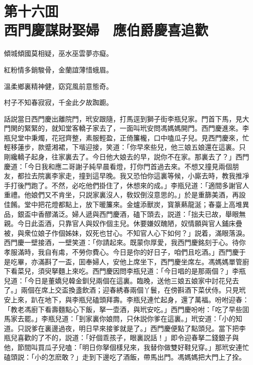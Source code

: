 
\chapter*{第十六囬　\\西門慶謀財娶婦　應伯爵慶喜追歡}


\begin{myquote}
傾城傾國莫相疑，巫水巫雲夢亦癡。

紅粉情多銷駿骨，金蘭誼薄惜蛾眉。

溫柔鄉裏精神健，窈窕風前意態奇。

村子不知春寂寂，千金此夕故踟躕。
\end{myquote}

話説當日西門慶出離院門，玳安跟隨，打馬逕到獅子街李瓶兒家。門首下馬，見大門関的緊緊的，就知堂客轎子家去了，一面叫玳安問馮媽媽開門。西門慶進來。李瓶兒堂中秉燭，花冠齊整，素服輕盈，正倚簾櫳，口中嗑瓜子兒。見西門慶來，忙輕移蓮步，款蹙湘裙，下堦迎接，笑道：「你早來些兒，他三娘五娘還在這裏。只剛纔轎子起身，往家裏去了。今日他大娘去的早，説你不在家。那裏去了？」西門慶道：「今日我和應二哥謝子純早晨看燈，打你門首過去來。不想又撞見兩個朋友，都拉去院裏李家走，撞到這早晚。我又恐怕你這裏等候，小廝去時，教我推凈手打後門跑了。不然，必吃他們掛住了，休想來的成。」李瓶兒道：「適間多謝官人重禮。他娘們又不肯坐，只説家裏沒人，敎奴倒沒意思的。」於是重篩美酒，再設佳餚。堂中把花燈都點上，放下暖簾來。金爐添獸炭，寳篆爇龍涎；春臺上高堆異品，銀盃中香醪滿泛。婦人遞與西門慶酒，磕下頭去，説道：「拙夫已故，舉眼無親。今日此盃酒，只靠官人與奴作個主兒。休要嫌奴醜陋，奴情願與官人鋪床疊被，與衆位娘子作個姊妹，奴死也甘心。不知官人心下如何？」説着，滿眼落淚。西門慶一壁接酒，一壁笑道：「你請起來。既蒙你厚愛，我西門慶銘刻于心。待你孝服滿時，我自有䖏，不勞你費心。今日是你的好日子，咱們且吃酒。」西門慶于是吃畢，亦滿斟了一盃，囬奉婦人，安他上席坐下，西門慶坐席左。馮媽媽單管廚下看菜兒，須臾拏麵上來吃。西門慶因問李瓶兒道：「今日唱的是那兩個？」李瓶兒道：「今日是董嬌兒韓金釧兒兩個在這裏。臨晚，送他三娘五娘家中討花兒去了。」兩個在席上交盃換盞飲酒；迎春綉春兩個丫鬟，在傍斟酒下菜伏侍。只見玳安上來，趴在地下，與李瓶兒磕頭拜壽。李瓶兒連忙起身，還了萬福。吩咐迎春：「教老馮廚下看壽麵點心下飯，拏一壶酒，與玳安吃。」西門慶吩咐：「吃了早些囬馬家去罷。」李瓶兒道：「到家裏你娘問，只休説你爹在這裏。」玳安道：「小的知道。只説爹在裏邊過夜，明日早來接爹就是了。」西門慶便點了點頭兒。當下把李瓶兒喜歡的了不的，説道：「好個乖孩子，眼裏説話！」即令迎春拏二錢銀子與他，節間叫買瓜子兒嗑：「明日你拏個樣兒來，我替你做雙好鞋兒穿。」那玳安連忙磕頭説：「小的怎麽敢？」走到下邊吃了酒飯，帶馬出門。馮媽媽把大門上了拴。

